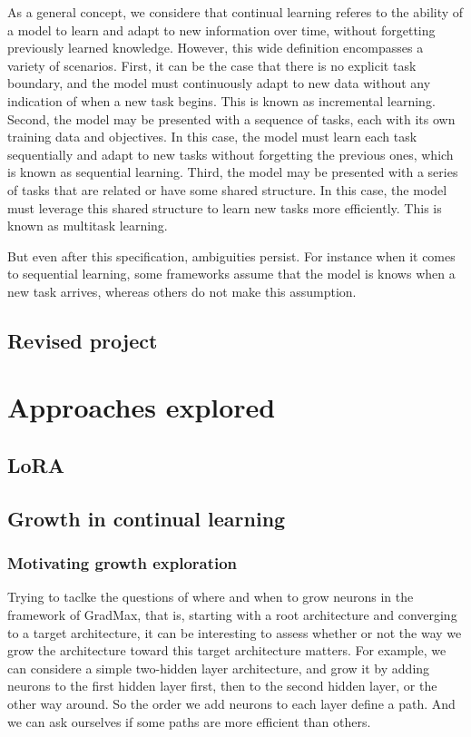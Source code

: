 \documentclass{article}
\begin{document}
As a general concept, we considere that continual learning referes to the ability of a model to learn and adapt to new information over time, without forgetting previously learned knowledge. However, this wide definition encompasses a variety of scenarios.
First, it can be the case that there is no explicit task boundary, and the model must continuously adapt to new data without any indication of when a new task begins. This is known as incremental learning. Second, the model may be presented with a sequence of tasks, each with its own training data and objectives. In this case, the model must learn each task sequentially and adapt to new tasks without forgetting the previous ones, which is known as sequential learning. Third, the model may be presented with a series of tasks that are related or have some shared structure. In this case, the model must leverage this shared structure to learn new tasks more efficiently. This is known as multitask learning.

But even after this specification, ambiguities persist. For instance when it comes to sequential learning, some frameworks assume that the model is knows when a new task arrives, whereas others do not make this assumption.

\subsection{Revised project}


\section{Approaches explored}
\subsection{LoRA}


\subsection{Growth in continual learning}
\subsubsection{Motivating growth exploration}


Trying to taclke the questions of where and when to grow neurons in the framework of GradMax, that is, starting with a root architecture and converging to a target architecture, it can be interesting to assess whether or not the way we grow the architecture toward this target architecture matters. For example, we can considere a simple two-hidden layer architecture, and grow it by adding neurons to the first hidden layer first, then to the second hidden layer, or the other way around. So the order we add neurons to each layer define a path. And we can ask ourselves if some paths are more efficient than others.
\end{document}
